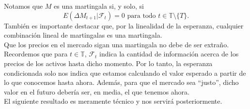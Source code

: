 Notamos que $ M $ es una martingala si, y solo, si
\[
E(\Delta M_{t+1} |\mathcal{F}_t ) = 0 \text{ para todo } t\in \mathbb{T}\setminus\{T\}.
\]
También es importante destacar que, por la linealidad de la esperanza, cualquier combinación lineal de martingalas es una martingala. \\

Que los precios en el mercado sigan una martingala no debe de ser extraño. Recordemos que para $ t \in \mathbb{T} $, $ \mathcal{F}_t $ indica la cantidad de información acerca de los precios de los activos hasta dicho momento. Por lo tanto, la esperanza condicionada solo nos indica que estamos calculando el valor esperado a partir de lo que conocemos hasta ahora. Además, para que el mercado sea ``justo'', dicho valor en el futuro debería ser, en media, el que tenemos ahora. \\

El siguiente resultado es meramente técnico y nos servirá posteriormente. 

